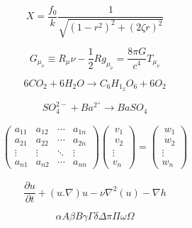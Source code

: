 \documentclass{article}
\begin{document}
\[X=\frac{f_0}{k} \frac{1}{\sqrt{(1-r^2)^2+(2\zeta r)^2}}\]

\[G_\mu_\nu\equiv R_\mu\nu - \frac{1}{2}Rg_\mu_ \nu=\frac{8\pi G}{c^4}T_\mu_\nu\]

\[6CO_2 + 6H_2O \rightarrow C_6H_1_2O_6 + 6O_2\]

\[SO_4^{2-} + Ba^2^+ \rightarrow BaSO_4\]

\begin{gather*}\begin{pmatrix}
    a_{11} &  a_{12} & \cdots & a_{1n} \\
    a_{21} &  a_{22} & \cdots & a_{2n} \\
    \vdots &  \vdots & \ddots & \vdots \\
    a_{n1} &  a_{n2} & \cdots & a_{nn}
\end{pmatrix}\begin{pmatrix}
    \ v_{1} \\[0.3em]
    \ v_{2} \\[0.3em]
    \vdots \\[0.3em]
    v_{n}
\end{pmatrix} = \begin{pmatrix}
    \ w_{1} \\
    \ w_{2} \\
    \vdots \\
    w_{n}
\end{pmatrix}
\end{gather*}

\[\frac{\partial u}{\partial t}+ (u.\nabla) u-\nu\nabla^2(u)-\nabla h \]

\[\alpha A \beta B \gamma\Gamma \delta\Delta \pi\Pi \omega\Omega\]
\end{document}
